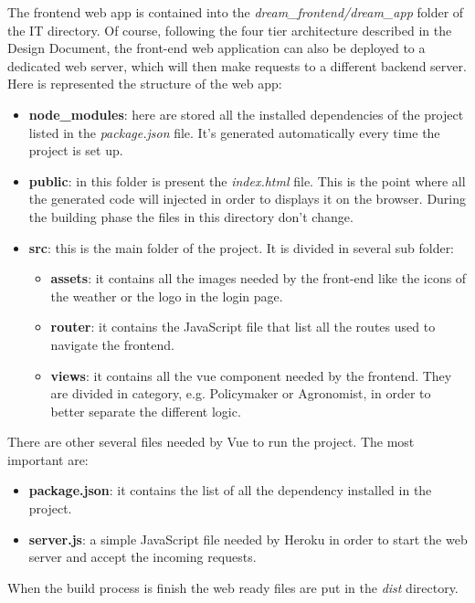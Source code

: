 \documentclass[table, 12pt]{article}
\begin{document}
The frontend web app is contained into the \textit{dream\_frontend/dream\_app} folder of
the IT directory.
Of course, following the four tier architecture described in the Design Document,
the front-end web application can also be deployed to a dedicated web server,
which will then make requests to a different backend server.
Here is represented the structure of the web app:
\begin{itemize}
    \item \textbf{node\_modules}: here are stored all the installed dependencies of the project listed in the \textit{package.json} file.
    It's generated automatically every time the project is set up.
    \item \textbf{public}: in this folder is present the \textit{index.html} file.
    This is the point where all the generated code will injected in order to displays it on the browser.
    During the building phase the files in this directory don't change.
    \item \textbf{src}: this is the main folder of the project. It is divided in several sub folder:
    \begin {itemize}
        \item \textbf{assets}: it contains all the images needed by the front-end like the icons of the weather or the logo in the login page.
        \item \textbf{router}: it contains the JavaScript file that list all the routes used to navigate the frontend.
        \item \textbf{views}: it contains all the vue component needed by the frontend.
        They are divided in category, e.g. Policymaker or Agronomist, in order to better separate the different logic.
    \end{itemize}
\end{itemize}

There are other several files needed by Vue to run the project. The most important are:
\begin{itemize}
    \item \textbf{package.json}: it contains the list of all the dependency installed in the project.
    \item \textbf{server.js}: a simple JavaScript file needed by Heroku in order to start the web server and accept the incoming requests.
\end{itemize}

When the build process is finish the web ready files are put in the \textit{dist} directory.
\end{document}
